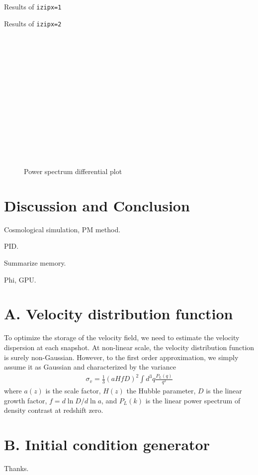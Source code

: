 \documentclass[10pt,twocolumn,preprint]{emulateapj}
\begin{document}
Results of {\tt izipx=1}

Results of {\tt izipx=2}

\begin{figure}[h]
\begin{verbatim}
















\end{verbatim}

\caption{Power spectrum differential plot}
\label{fig.power}
\end{figure}

\section{Discussion and Conclusion}
Cosmological simulation, PM method.

PID.

Summarize memory.

Phi, GPU.


\clearpage

\appendix
\section{A. Velocity distribution function}
To optimize the storage of the velocity field, we need to estimate the velocity dispersion at each snapshot. At non-linear scale, the velocity distribution function is surely non-Gaussian. However, to the first order approximation, we simply assume it as Gaussian and characterized by the variance
\begin{eqnarray}
\sigma_v = \frac{1}{3}  (a H f D)^2 \int d^3q \frac{P_{L}(q)}{q^2} 
\end{eqnarray}
where $a(z)$ is the scale factor, $H(z)$ the Hubble parameter, $D$ is the linear growth factor, $f=d \ln D/d\ln a$, 
and $P_L(k)$ is the linear power spectrum of density contrast at redshift zero. 

 

\section{B. Initial condition generator}


\acknowledgements
Thanks.



\end{document}

